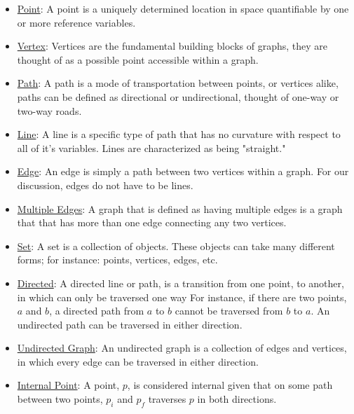 \documentclass[a4paper,man,natbib]{apa6}
\begin{document}
\begin{itemize}

      \item \underline{Point}: A point is a uniquely determined location in space quantifiable by one or more reference variables.

      \item \underline{Vertex}: Vertices are the fundamental building blocks of graphs, they are thought of as a possible point accessible within a graph.

      \item \underline{Path}: A path is a mode of transportation between points, or vertices alike, paths can be defined as directional or undirectional, thought of one-way or two-way roads.

      \item \underline{Line}: A line is a specific type of path that has no curvature with respect to all of it's variables. Lines are characterized as being "straight."

      \item \underline{Edge}: An edge is simply a path between two vertices within a graph. For our discussion, edges do not have to be lines.

      \item \underline{Multiple Edges}: A graph that is defined as having multiple edges is a graph that that has more than one edge connecting any two vertices.

      \item \underline{Set}: A set is a collection of objects. These objects can take many different forms; for instance: points, vertices, edges, etc.

      \item \underline{Directed}: A directed line or path, is a transition from one point, to another, in which can only be traversed one way
      For instance, if there are two points, $ a $ and $ b $, a directed path from $ a $ to $ b $ cannot be traversed from $ b $ to $ a $. An undirected path can be traversed in either direction.

      \item \underline{Undirected Graph}: An undirected graph is a collection of edges and vertices, in which every edge can be traversed in either direction.

      \item \underline{Internal Point}: A point, $ p $, is considered internal given that on some path between two points, $ p_i $ and $ p_f $ traverses $ p $ in both directions.


\end{itemize}
\end{document}
